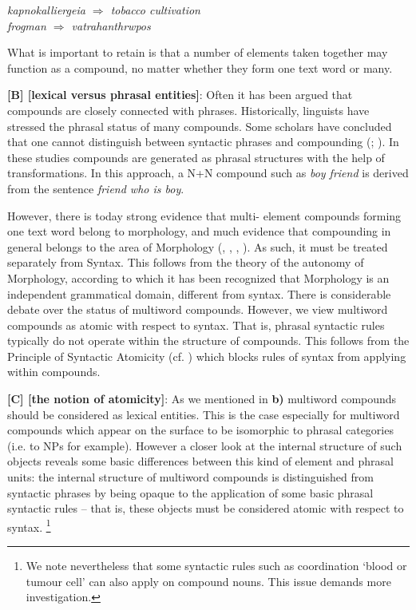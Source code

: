\begin{center}
{\em  kapnokalliergeia $\Rightarrow$ tobacco cultivation \\
      frogman $\Rightarrow$ vatrahanthrwpos\\}
\end{center}

\noindent
What  is important to retain is that a number of  elements  taken 
together may function as a compound,  no matter whether they form 
one text word or many.

{\bf [B] [lexical versus phrasal entities]}:
Often  it  has been argued that compounds are  closely  connected 
with phrases.  Historically,  linguists have stressed the phrasal 
status  of many compounds.  Some scholars have concluded that one 
cannot  distinguish  between syntactic  phrases  and  compounding 
(\cite[p.~233]{Bloomfield35}; \cite{Lees60}). In these studies compounds 
are   generated   as   phrasal  structures  with  the   help   of 
transformations.  In this approach,  a N+N compound such as  {\it boy 
friend} is derived from the sentence {\it friend who is boy}.

However,    there   is   today   strong  evidence   that   multi-
element  compounds    forming   one   text   word    belong    to 
morphology,   and  much  evidence  that  compounding  in  general  
belongs  to  the area of  Morphology (\cite{Lieber83}, \cite{Selkirk82}, 
\cite{DiSciullo87}, \cite{Sproat92}).   As  such,   
it   must  be 
treated separately from Syntax.  This  follows from the theory of 
the  autonomy  of Morphology,  according to which it   has   been  
recognized   that   Morphology  is  an   independent  grammatical  
domain,  different from syntax.  
There  is  considerable  debate  over  the  status  of  multiword 
compounds.  However,  we  view multiword compounds as atomic with 
respect to syntax.  That is, phrasal syntactic rules typically do 
not operate within  the  structure  of  compounds.  This  follows  
from   the  Principle of Syntactic Atomicity (cf. \cite{DiSciullo87})
which blocks rules of syntax from applying within compounds.
 
{\bf [C] [the notion of atomicity]}:
As   we mentioned in {\bf b)} multiword compounds should be  considered 
as  lexical entities.   This is the case especially for multiword 
compounds  which  appear  on  the surface  to  be  isomorphic  to 
phrasal categories  (i.e.   to NPs for example). However a closer 
look  at  the  internal structure of  such objects  reveals  some 
basic differences between this kind of element and phrasal units: 
the  internal structure of multiword compounds  is  distinguished 
from  syntactic  phrases by being opaque to  the  application  of 
some basic phrasal syntactic rules  -- that is,   these   objects  
must be considered atomic  with  respect  to syntax. 
\footnote{We  note nevertheless that some syntactic rules such 
as coordination `blood or tumour cell' can also apply on compound 
nouns. This issue demands more investigation.}

